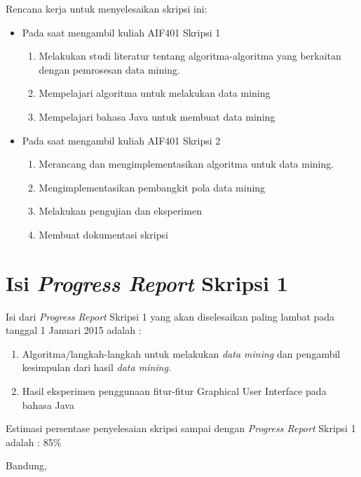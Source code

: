 \documentclass[a4paper,twoside]{article}
\begin{document}
Rencana kerja untuk menyelesaikan skripsi ini:
\begin{itemize}
	\item Pada saat mengambil kuliah AIF401 Skripsi 1
	\begin{enumerate}
		\item Melakukan studi literatur tentang algoritma-algoritma yang berkaitan dengan pemrosesan data mining.
		\item Mempelajari algoritma untuk melakukan data mining
		\item Mempelajari bahasa Java untuk membuat data mining
	\end{enumerate}
	\item Pada saat mengambil kuliah AIF401 Skripsi 2
	\begin{enumerate}
		\item Merancang dan mengimplementasikan algoritma untuk data mining.
		\item Mengimplementasikan pembangkit pola data mining
		\item Melakukan pengujian dan eksperimen
		\item Membuat dokumentasi skripsi
	\end{enumerate}
\end{itemize}

\section{Isi {\it Progress Report} Skripsi 1}
Isi dari {\it Progress Report} Skripsi 1 yang akan diselesaikan paling lambat pada tanggal 1 Januari 2015 adalah :
\begin{enumerate}
	\item Algoritma/langkah-langkah untuk melakukan \textsl{data mining} dan pengambil kesimpulan dari hasil \textsl{data mining}.
	\item Hasil eksperimen penggunaan fitur-fitur Graphical User Interface pada bahasa Java
\end{enumerate}
Estimasi persentase penyelesaian skripsi sampai dengan {\it Progress Report} Skripsi 1 adalah : 85\%
\vspace{1.5cm}

\centering Bandung, \tanggal\\
\vspace{2cm} \nama \\ 
\vspace{1cm}
\end{document}
